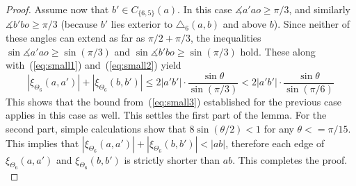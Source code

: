 \documentclass[runningheads,a4paper]{llncs}
\newcommand{\ABox}{
\raisebox{3pt}{\framebox[6pt]{\rule{6pt}{0pt}}}
}
\newcommand{\pp}{\xi}
\newcommand{\ang}{\measuredangle}
\begin{document}
\begin{proof}
Assume now that $b' \in C_{\{6,5\}}(a)$. In this case $\ang{a'ao} \ge \pi/3$, and similarly $\ang{b'bo} \ge \pi/3$ (because $b'$ lies exterior to $\triangle_6(a,b)$ and above $b$). Since neither of these angles can extend as far as $\pi/2+\pi/3$, the inequalities 
$\sin\ang{a'ao} \ge \sin(\pi/3)$ and $\sin\ang{b'bo} \ge \sin(\pi/3)$ hold. These along with~(\ref{eq:small1}) and~(\ref{eq:small2}) yield 
\begin{equation*}
|\pp_{\Theta_6}(a, a')| +|\pp_{\Theta_6}(b, b')| \le 2|a'b'|\cdot \frac{\sin\theta}{\sin(\pi/3)} < 2|a'b'|\cdot \frac{\sin\theta}{\sin(\pi/6)}
\label{eq:small4}
\end{equation*}
This shows that the bound from~(\ref{eq:small3}) established for the previous case applies in this case as well. This settles the first part of the lemma. For the second part, simple calculations show that $8\sin(\theta/2) < 1$ for any $\theta <= \pi/15$. This implies that $|\pp_{\Theta_6}(a, a')| + |\pp_{\Theta_6}(b, b')| < |ab|$, therefore each edge of $\pp_{\Theta_6}(a,a')$ and $\pp_{\Theta_6}(b,b')$ is strictly shorter than $ab$. This completes the proof.
{\hfill\ABox}\end{proof}
\end{document}
